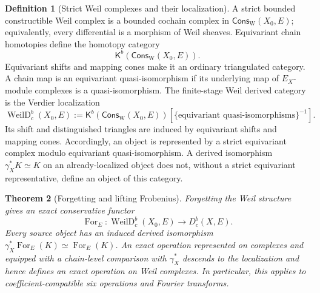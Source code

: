 \documentclass[10pt]{article}
\newtheorem{theorem}{Theorem}[section]
\theoremstyle{definition}
\newtheorem{definition}[theorem]{Definition}
\begin{document}
\begin{definition}[Strict Weil complexes and their localization]
A strict bounded constructible Weil complex is a bounded cochain complex in
\(\mathsf{Cons}_{\mathrm W}(X_0,E)\); equivalently, every differential is a
morphism of Weil sheaves.  Equivariant chain homotopies define the homotopy
category
\[
 \mathsf K^b(\mathsf{Cons}_{\mathrm W}(X_0,E)).
\]
Equivariant shifts and mapping cones make it an ordinary triangulated
category.  A chain map is an equivariant quasi-isomorphism if its underlying
map of \(E_X\)-module complexes is a quasi-isomorphism.  The finite-stage
Weil derived category is the Verdier localization
\[
 \operatorname{WeilD}^b_c(X_0,E)
 :=\mathsf K^b(\mathsf{Cons}_{\mathrm W}(X_0,E))
       [\{\text{equivariant quasi-isomorphisms}\}^{-1}].
\]
Its shift and distinguished triangles are induced by equivariant shifts
and mapping cones.  Accordingly, an object is represented by a strict
equivariant complex modulo equivariant quasi-isomorphism.  A derived
isomorphism \(\gamma_X^*K\simeq K\) on an already-localized object does not,
without a strict equivariant representative, define an object of this
category.
\end{definition}

\begin{theorem}[Forgetting and lifting Frobenius]
Forgetting the Weil structure gives an exact conservative functor
\[
 \operatorname{For}_E:\operatorname{WeilD}^b_c(X_0,E)
             \longrightarrow D^b_c(X,E).
\]
Every source object has an induced derived isomorphism
\(\gamma_X^*\operatorname{For}_E(K)\simeq\operatorname{For}_E(K)\).
An exact operation represented on complexes and equipped with a chain-level
comparison with \(\gamma_X^*\) descends to the localization and hence
defines an exact operation on Weil complexes.  In particular, this applies
to coefficient-compatible six operations and Fourier transforms.
\end{theorem}
\end{document}
